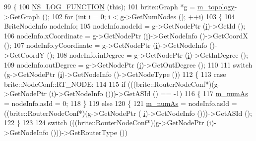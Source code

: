 \begin{DoxyCode}
99 \{
100   \hyperlink{log-macros-disabled_8h_a90b90d5bad1f39cb1b64923ea94c0761}{NS\_LOG\_FUNCTION} (\textcolor{keyword}{this});
101   brite::Graph *\hyperlink{buildings__pathloss_8m_a93aaa9148bded292f2e18b0907fce426}{g} = \hyperlink{classns3_1_1BriteTopologyHelper_a1756fddb45019b7ed9a9e3bbc0e479c6}{m\_topology}->GetGraph ();
102   \textcolor{keywordflow}{for} (\textcolor{keywordtype}{int} \hyperlink{bernuolliDistribution_8m_a6f6ccfcf58b31cb6412107d9d5281426}{i} = 0; \hyperlink{bernuolliDistribution_8m_a6f6ccfcf58b31cb6412107d9d5281426}{i} < g->GetNumNodes (); ++\hyperlink{bernuolliDistribution_8m_a6f6ccfcf58b31cb6412107d9d5281426}{i})
103     \{
104       BriteNodeInfo nodeInfo;
105       nodeInfo.nodeId = g->GetNodePtr (\hyperlink{bernuolliDistribution_8m_a6f6ccfcf58b31cb6412107d9d5281426}{i})->GetId ();
106       nodeInfo.xCoordinate = g->GetNodePtr (\hyperlink{bernuolliDistribution_8m_a6f6ccfcf58b31cb6412107d9d5281426}{i})->GetNodeInfo ()->GetCoordX ();
107       nodeInfo.yCoordinate = g->GetNodePtr (\hyperlink{bernuolliDistribution_8m_a6f6ccfcf58b31cb6412107d9d5281426}{i})->GetNodeInfo ()->GetCoordY ();
108       nodeInfo.inDegree = g->GetNodePtr (\hyperlink{bernuolliDistribution_8m_a6f6ccfcf58b31cb6412107d9d5281426}{i})->GetInDegree ();
109       nodeInfo.outDegree = g->GetNodePtr (\hyperlink{bernuolliDistribution_8m_a6f6ccfcf58b31cb6412107d9d5281426}{i})->GetOutDegree ();
110 
111       \textcolor{keywordflow}{switch} (g->GetNodePtr (\hyperlink{bernuolliDistribution_8m_a6f6ccfcf58b31cb6412107d9d5281426}{i})->GetNodeInfo ()->GetNodeType ())
112         \{
113         \textcolor{keywordflow}{case} brite::NodeConf::RT\_NODE:
114 
115           \textcolor{keywordflow}{if} (((brite::RouterNodeConf*)(g->GetNodePtr (\hyperlink{bernuolliDistribution_8m_a6f6ccfcf58b31cb6412107d9d5281426}{i})->GetNodeInfo ()))->GetASId () == -1)
116             \{
117               \hyperlink{classns3_1_1BriteTopologyHelper_a4dc95255dc0dfeeabd5e2fcd1d31cb13}{m\_numAs} = nodeInfo.asId = 0;
118             \}
119           \textcolor{keywordflow}{else}
120             \{
121               \hyperlink{classns3_1_1BriteTopologyHelper_a4dc95255dc0dfeeabd5e2fcd1d31cb13}{m\_numAs} = nodeInfo.asId = ((brite::RouterNodeConf*)(g->GetNodePtr (
      \hyperlink{bernuolliDistribution_8m_a6f6ccfcf58b31cb6412107d9d5281426}{i})->GetNodeInfo ()))->GetASId ();
122             \}
123 
124           \textcolor{keywordflow}{switch} (((brite::RouterNodeConf*)(g->GetNodePtr (\hyperlink{bernuolliDistribution_8m_a6f6ccfcf58b31cb6412107d9d5281426}{i})->GetNodeInfo ()))->GetRouterType ())

\end{DoxyCode}
